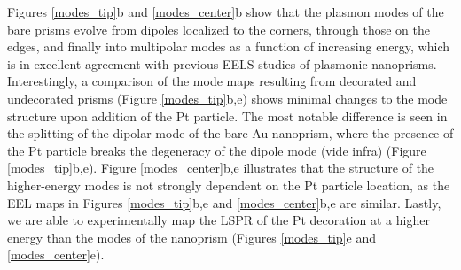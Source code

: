 \documentclass [11pt, proquest] {uwthesis}[2016/11/22]
\begin{document}
Figures \ref{modes_tip}b and \ref{modes_center}b show that the plasmon modes of the bare prisms evolve from dipoles localized to the corners, through those on the edges, and finally into multipolar modes as a function of increasing energy, which is in excellent agreement with previous EELS studies of plasmonic nanoprisms\cite{ColliexMapping,ColliexEELS}. Interestingly, a comparison of the mode maps resulting from decorated and undecorated prisms (Figure \ref{modes_tip}b,e) shows minimal changes to the mode structure upon addition of the Pt particle. The most notable difference is seen in the splitting of the dipolar mode of the bare Au nanoprism, where the presence of the Pt particle breaks the degeneracy of the dipole mode (vide infra) (Figure \ref{modes_tip}b,e). Figure \ref{modes_center}b,e illustrates that the structure of the higher-energy modes is not strongly dependent on the Pt particle location, as the EEL maps in Figures \ref{modes_tip}b,e and \ref{modes_center}b,e are similar. Lastly, we are able to experimentally map the LSPR of the Pt decoration at a higher energy than the modes of the nanoprism (Figures \ref{modes_tip}e and \ref{modes_center}e).
\end{document}
